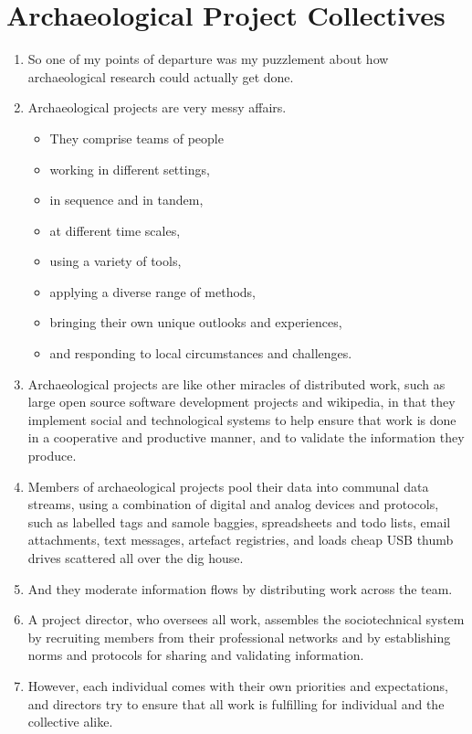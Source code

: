 \documentclass[12pt]{article}
\begin{document}
\section{Archaeological Project Collectives}
\begin{enumerate}
  \item So one of my points of departure was my puzzlement about how archaeological research could actually get done.
  \item Archaeological projects are very messy affairs.
  \begin{itemize}
    \item They comprise teams of people
    \item working in different settings,
    \item in sequence and in tandem,
    \item at different time scales,
    \item using a variety of tools,
    \item applying a diverse range of methods,
    \item bringing their own unique outlooks and experiences,
    \item and responding to local circumstances and challenges.
  \end{itemize}
  \item Archaeological projects are like other miracles of distributed work, such as large open source software development projects and wikipedia, in that they implement social and technological systems to help ensure that work is done in a cooperative and productive manner, and to validate the information they produce.
  \item Members of archaeological projects pool their data into communal data streams, using a combination of digital and analog devices and protocols, such as labelled tags and samole baggies, spreadsheets and todo lists, email attachments, text messages, artefact registries, and loads cheap USB thumb drives scattered all over the dig house.
  \item And they moderate information flows by distributing work across the team.
  \item A project director, who oversees all work, assembles the sociotechnical system by recruiting members from their professional networks and by establishing norms and protocols for sharing and validating information.
  \item However, each individual comes with their own priorities and expectations, and directors try to ensure that all work is fulfilling for individual and the collective alike.
\end{enumerate}
\end{document}
